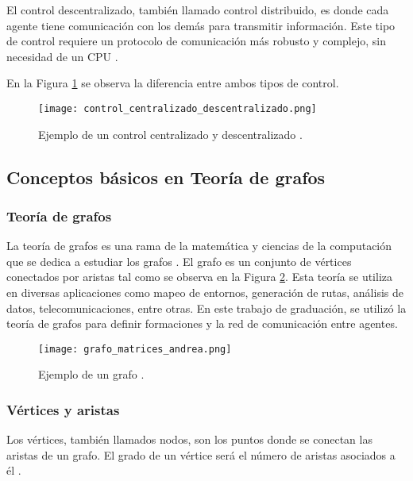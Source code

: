 El control descentralizado, también llamado control distribuido, es donde cada agente tiene comunicación con los demás para transmitir información. Este tipo de control requiere un protocolo de comunicación más robusto y complejo, sin necesidad de un CPU \cite{Control_centralizado_descentralizado}.

En la Figura \ref{fig:control_centralizado_descentralizado} se observa la diferencia entre ambos tipos de control.

\begin{figure}[H]
	\centering
	\texttt{[image: control\_centralizado\_descentralizado.png]}
	\caption{Ejemplo de un control centralizado y descentralizado \cite{Control_centralizado_descentralizado}.}
	\label{fig:control_centralizado_descentralizado}
\end{figure}


\subsection*{Conceptos básicos en Teoría de grafos}

\subsubsection*{Teoría de grafos}
La teoría de grafos es una rama de la matemática y ciencias de la computación que se dedica a estudiar los grafos \cite{teoria_de_grafos}. El grafo es un conjunto de vértices conectados por aristas tal como se observa en la Figura \ref{fig:teoria_de_grafos}. Esta teoría se utiliza en diversas aplicaciones como mapeo de entornos, generación de rutas, análisis de datos, telecomunicaciones, entre otras. En este trabajo de graduación, se utilizó la teoría de grafos para definir formaciones y la red de comunicación entre agentes.

\begin{figure}[H]
	\centering
	\texttt{[image: grafo\_matrices\_andrea.png]}
	\caption{Ejemplo de un grafo \cite{PenaAM_2019_tesis}.}
	\label{fig:teoria_de_grafos}
\end{figure}

\subsubsection*{Vértices y aristas}
Los vértices, también llamados nodos, son los puntos donde se conectan las aristas de un grafo. El grado de un vértice será el número de aristas asociados a él \cite{teoria_de_grafos}. 

